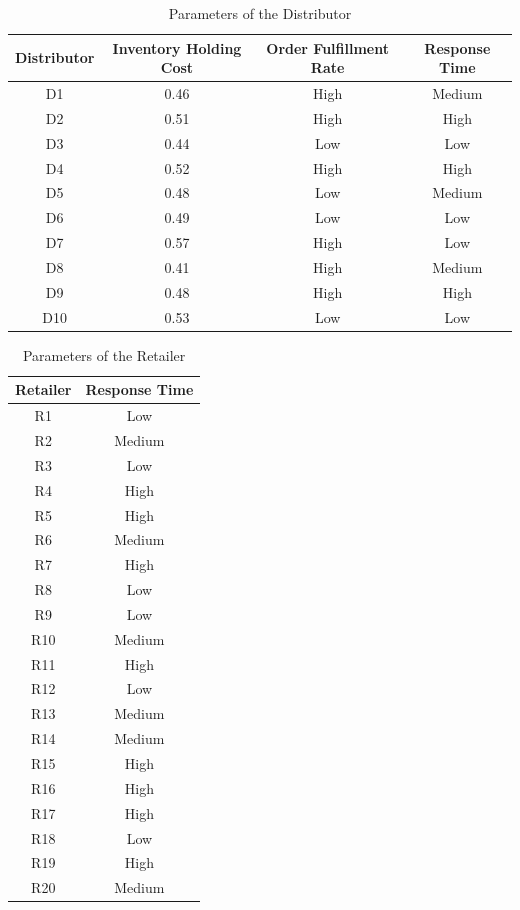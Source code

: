 \begin{table}[H]
\caption{Parameters of the Distributor}
\label{tab:Distributor}
\begin{center}
\begin{tabular}[b]{|c|c|c|c|}
	\hline
	Distributor & Inventory Holding Cost & Order Fulfillment Rate & Response Time \\ \hline
	D1 & 0.46 & High & Medium\\ \hline
	D2 & 0.51 & High & High \\ \hline
	D3 & 0.44 & Low & Low \\ \hline
	D4 & 0.52 & High & High \\ \hline
	D5 & 0.48 & Low & Medium \\ \hline
	D6 & 0.49 & Low & Low \\ \hline
	D7 & 0.57 & High & Low \\ \hline
    D8 & 0.41 & High & Medium \\ \hline
    D9 & 0.48 & High & High \\ \hline
    D10 & 0.53 & Low & Low \\ \hline
\end{tabular}
\end{center}
\end{table}

\begin{table}[H]
\caption{Parameters of the Retailer}
\label{tab:Retailer}
\begin{center}
\begin{tabular}[b]{|c|c|}
	\hline
	Retailer & Response Time \\ \hline
	R1 & Low \\ \hline
	R2 & Medium \\ \hline
	R3 & Low \\ \hline
	R4 & High \\ \hline
	R5 & High \\ \hline
	R6 & Medium \\ \hline
	R7 & High \\ \hline
	R8 & Low \\ \hline
	R9 & Low \\ \hline
	R10 & Medium \\ \hline
	R11 & High \\ \hline
	R12 & Low \\ \hline
	R13 & Medium \\ \hline
	R14 & Medium \\ \hline
	R15 & High \\ \hline
	R16 & High \\ \hline
	R17 & High \\ \hline
	R18 & Low \\ \hline
	R19 & High \\ \hline
	R20 & Medium \\ \hline
\end{tabular}
\end{center}
\end{table}

